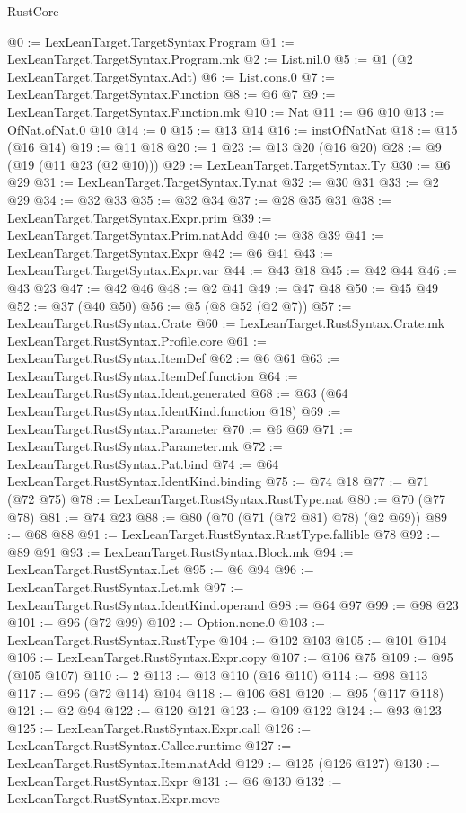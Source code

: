 \begin{lexlean}{RustCore}
\begin{coremodule}
@0 := LexLeanTarget.TargetSyntax.Program
@1 := LexLeanTarget.TargetSyntax.Program.mk
@2 := List.nil.{0}
@5 := @1 (@2 LexLeanTarget.TargetSyntax.Adt)
@6 := List.cons.{0}
@7 := LexLeanTarget.TargetSyntax.Function
@8 := @6 @7
@9 := LexLeanTarget.TargetSyntax.Function.mk
@10 := Nat
@11 := @6 @10
@13 := OfNat.ofNat.{0} @10
@14 := 0
@15 := @13 @14
@16 := instOfNatNat
@18 := @15 (@16 @14)
@19 := @11 @18
@20 := 1
@23 := @13 @20 (@16 @20)
@28 := @9 (@19 (@11 @23 (@2 @10)))
@29 := LexLeanTarget.TargetSyntax.Ty
@30 := @6 @29
@31 := LexLeanTarget.TargetSyntax.Ty.nat
@32 := @30 @31
@33 := @2 @29
@34 := @32 @33
@35 := @32 @34
@37 := @28 @35 @31
@38 := LexLeanTarget.TargetSyntax.Expr.prim
@39 := LexLeanTarget.TargetSyntax.Prim.natAdd
@40 := @38 @39
@41 := LexLeanTarget.TargetSyntax.Expr
@42 := @6 @41
@43 := LexLeanTarget.TargetSyntax.Expr.var
@44 := @43 @18
@45 := @42 @44
@46 := @43 @23
@47 := @42 @46
@48 := @2 @41
@49 := @47 @48
@50 := @45 @49
@52 := @37 (@40 @50)
@56 := @5 (@8 @52 (@2 @7))
@57 := LexLeanTarget.RustSyntax.Crate
@60 := LexLeanTarget.RustSyntax.Crate.mk LexLeanTarget.RustSyntax.Profile.core
@61 := LexLeanTarget.RustSyntax.ItemDef
@62 := @6 @61
@63 := LexLeanTarget.RustSyntax.ItemDef.function
@64 := LexLeanTarget.RustSyntax.Ident.generated
@68 := @63 (@64 LexLeanTarget.RustSyntax.IdentKind.function @18)
@69 := LexLeanTarget.RustSyntax.Parameter
@70 := @6 @69
@71 := LexLeanTarget.RustSyntax.Parameter.mk
@72 := LexLeanTarget.RustSyntax.Pat.bind
@74 := @64 LexLeanTarget.RustSyntax.IdentKind.binding
@75 := @74 @18
@77 := @71 (@72 @75)
@78 := LexLeanTarget.RustSyntax.RustType.nat
@80 := @70 (@77 @78)
@81 := @74 @23
@88 := @80 (@70 (@71 (@72 @81) @78) (@2 @69))
@89 := @68 @88
@91 := LexLeanTarget.RustSyntax.RustType.fallible @78
@92 := @89 @91
@93 := LexLeanTarget.RustSyntax.Block.mk
@94 := LexLeanTarget.RustSyntax.Let
@95 := @6 @94
@96 := LexLeanTarget.RustSyntax.Let.mk
@97 := LexLeanTarget.RustSyntax.IdentKind.operand
@98 := @64 @97
@99 := @98 @23
@101 := @96 (@72 @99)
@102 := Option.none.{0}
@103 := LexLeanTarget.RustSyntax.RustType
@104 := @102 @103
@105 := @101 @104
@106 := LexLeanTarget.RustSyntax.Expr.copy
@107 := @106 @75
@109 := @95 (@105 @107)
@110 := 2
@113 := @13 @110 (@16 @110)
@114 := @98 @113
@117 := @96 (@72 @114) @104
@118 := @106 @81
@120 := @95 (@117 @118)
@121 := @2 @94
@122 := @120 @121
@123 := @109 @122
@124 := @93 @123
@125 := LexLeanTarget.RustSyntax.Expr.call
@126 := LexLeanTarget.RustSyntax.Callee.runtime
@127 := LexLeanTarget.RustSyntax.Item.natAdd
@129 := @125 (@126 @127)
@130 := LexLeanTarget.RustSyntax.Expr
@131 := @6 @130
@132 := LexLeanTarget.RustSyntax.Expr.move

\end{coremodule}
\end{lexlean}
